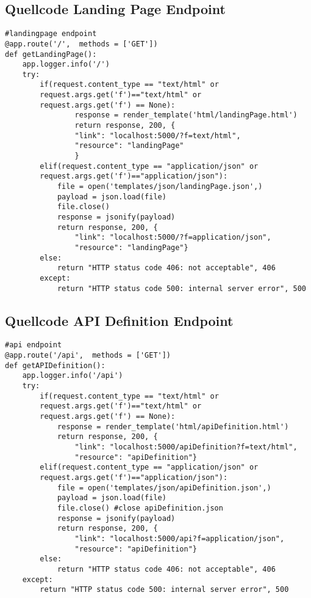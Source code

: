 \subsection{Quellcode Landing Page Endpoint}
\begin{lstlisting}[caption={Landing Page Endpoint}, style = Python]
#landingpage endpoint
@app.route('/',  methods = ['GET'])
def getLandingPage():
    app.logger.info('/') 
    try:
        if(request.content_type == "text/html" or
        request.args.get('f')=="text/html" or 
        request.args.get('f') == None):
                response = render_template('html/landingPage.html') 
                return response, 200, {
                "link": "localhost:5000/?f=text/html", 
                "resource": "landingPage"
                } 
        elif(request.content_type == "application/json" or
        request.args.get('f')=="application/json"): 
            file = open('templates/json/landingPage.json',) 
            payload = json.load(file) 
            file.close() 
            response = jsonify(payload) 
            return response, 200, {
                "link": "localhost:5000/?f=application/json", 
                "resource": "landingPage"} 
        else:
            return "HTTP status code 406: not acceptable", 406 
        except:
            return "HTTP status code 500: internal server error", 500 
\end{lstlisting}\label{QuellcodeLandingPage}

\newpage
\subsection{Quellcode API Definition Endpoint}
\begin{lstlisting}[caption={API Definition Endpoint}, style = Python]
#api endpoint
@app.route('/api',  methods = ['GET']) 
def getAPIDefinition():
    app.logger.info('/api') 
    try:
        if(request.content_type == "text/html" or
        request.args.get('f')=="text/html" or 
        request.args.get('f') == None): 
            response = render_template('html/apiDefinition.html') 
            return response, 200, {
                "link": "localhost:5000/apiDefinition?f=text/html", 
                "resource": "apiDefinition"} 
        elif(request.content_type == "application/json" or 
        request.args.get('f')=="application/json"): 
            file = open('templates/json/apiDefinition.json',) 
            payload = json.load(file) 
            file.close() #close apiDefinition.json
            response = jsonify(payload) 
            return response, 200, {
                "link": "localhost:5000/api?f=application/json", 
                "resource": "apiDefinition"} 
        else:
            return "HTTP status code 406: not acceptable", 406 
    except:
        return "HTTP status code 500: internal server error", 500
\end{lstlisting}\label{QuellcodeAPIDefinition}

